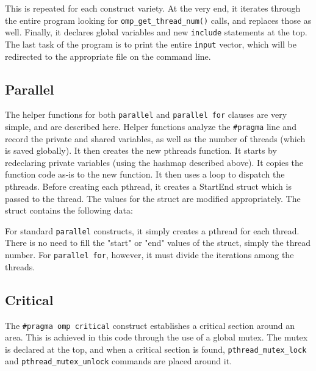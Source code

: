\documentclass[]{article}
\begin{document}
This is repeated for each construct variety. At the very end, it iterates through the entire program looking for \texttt{omp\_get\_thread\_num()} calls, and replaces those as well. Finally, it declares global variables and new \texttt{include} statements at the top. The last task of the program is to print the entire \texttt{input} vector, which will be redirected to the appropriate file on the command line.

\subsection{Parallel}
The helper functions for both \texttt{parallel} and \texttt{parallel for} clauses are very simple, and are described here. Helper functions analyze the \texttt{\#pragma} line and record the private and shared variables, as well as the number of threads (which is saved globally). It then creates the new pthreads function. It starts by redeclaring private variables (using the hashmap described above). It copies the function code as-is to the new function. It then uses a loop to dispatch the pthreads.
\newline \newline
Before creating each pthread, it creates a StartEnd struct which is passed to the thread. The values for the struct are modified appropriately. The struct contains the following data:
\newline


For standard \texttt{parallel} constructs, it simply creates a pthread for each thread. There is no need to fill the "start" or "end" values of the struct, simply the thread number. For \texttt{parallel for}, however, it must divide the iterations among the threads.

\subsection{Critical}
The \texttt{\#pragma omp critical} construct establishes a critical section around an area. This is achieved in this code through the use of a global mutex. The mutex is declared at the top, and when a critical section is found, \texttt{pthread\_mutex\_lock} and \texttt{pthread\_mutex\_unlock} commands are placed around it.
\end{document}
